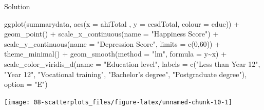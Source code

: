 \documentclass[
  oneside]{book}
\newenvironment{Shaded}{\begin{snugshade}}{\end{snugshade}}
\newcommand{\AttributeTok}[1]{\textcolor[rgb]{0.77,0.63,0.00}{#1}}
\newcommand{\DecValTok}[1]{\textcolor[rgb]{0.00,0.00,0.81}{#1}}
\newcommand{\FunctionTok}[1]{\textcolor[rgb]{0.00,0.00,0.00}{#1}}
\newcommand{\NormalTok}[1]{#1}
\newcommand{\SpecialCharTok}[1]{\textcolor[rgb]{0.00,0.00,0.00}{#1}}
\newcommand{\StringTok}[1]{\textcolor[rgb]{0.31,0.60,0.02}{#1}}
\begin{document}
Solution

\begin{Shaded}
\begin{Highlighting}[]
\FunctionTok{ggplot}\NormalTok{(summarydata, }\FunctionTok{aes}\NormalTok{(}\AttributeTok{x =}\NormalTok{ ahiTotal , }\AttributeTok{y =}\NormalTok{ cesdTotal, }
                        \AttributeTok{colour =}\NormalTok{ educ)) }\SpecialCharTok{+} 
  \FunctionTok{geom\_point}\NormalTok{() }\SpecialCharTok{+}
  \FunctionTok{scale\_x\_continuous}\NormalTok{(}\AttributeTok{name =} \StringTok{"Happiness Score"}\NormalTok{) }\SpecialCharTok{+}
  \FunctionTok{scale\_y\_continuous}\NormalTok{(}\AttributeTok{name =} \StringTok{"Depression Score"}\NormalTok{,}
                     \AttributeTok{limits =} \FunctionTok{c}\NormalTok{(}\DecValTok{0}\NormalTok{,}\DecValTok{60}\NormalTok{)) }\SpecialCharTok{+}
  \FunctionTok{theme\_minimal}\NormalTok{() }\SpecialCharTok{+}
  \FunctionTok{geom\_smooth}\NormalTok{(}\AttributeTok{method =} \StringTok{"lm"}\NormalTok{, }\AttributeTok{formula =}\NormalTok{ y}\SpecialCharTok{\textasciitilde{}}\NormalTok{x) }\SpecialCharTok{+}
  \FunctionTok{scale\_color\_viridis\_d}\NormalTok{(}\AttributeTok{name =} \StringTok{"Education level"}\NormalTok{, }
                       \AttributeTok{labels =} \FunctionTok{c}\NormalTok{(}\StringTok{"Less than Year 12"}\NormalTok{,}
                                  \StringTok{"Year 12"}\NormalTok{,}
                                  \StringTok{"Vocational training"}\NormalTok{,}
                                  \StringTok{"Bachelor’s degree"}\NormalTok{,}
                                  \StringTok{"Postgraduate degree"}\NormalTok{),}
                       \AttributeTok{option =} \StringTok{"E"}\NormalTok{)}
\end{Highlighting}
\end{Shaded}

\begin{center}\texttt{[image: 08-scatterplots\_files/figure-latex/unnamed-chunk-10-1]} \end{center}
\end{document}

